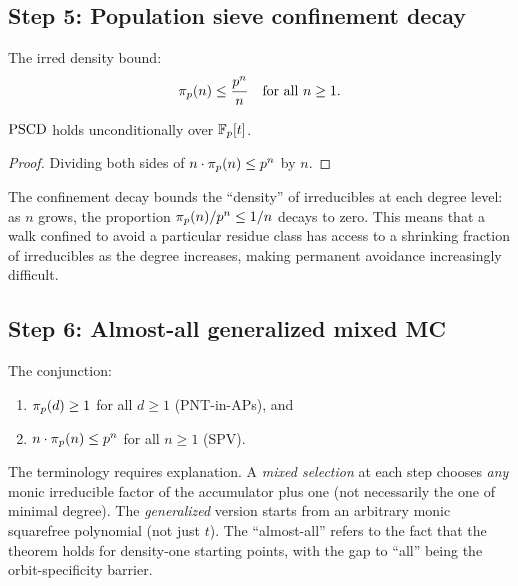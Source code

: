
\subsection{Step 5: Population sieve confinement decay}

\begin{definition}
The irred density bound:
\[
  \pi_p(n) \leq \frac{p^n}{n} \quad \text{for all } n \geq 1.
\]
\end{definition}

\begin{theorem}\label{thm:pscd}
$\mathrm{PSCD}$ holds unconditionally over $\mathbb{F}_p[t]$.
\end{theorem}

\begin{proof}
Dividing both sides of $n \cdot \pi_p(n) \leq p^n$ by $n$.
\end{proof}

The confinement decay bounds the ``density'' of irreducibles at each degree
level: as $n$ grows, the proportion $\pi_p(n) / p^n \leq 1/n$ decays
to zero. This means that a walk confined to avoid a particular residue class
has access to a shrinking fraction of irreducibles as the degree increases,
making permanent avoidance increasingly difficult.


\subsection{Step 6: Almost-all generalized mixed MC}

\begin{definition}\label{def:almost-all}
The conjunction:
\begin{enumerate}[label=(\roman*)]
  \item $\pi_p(d) \geq 1$ for all $d \geq 1$ (PNT-in-APs), and
  \item $n \cdot \pi_p(n) \leq p^n$ for all $n \geq 1$ (SPV).
\end{enumerate}
\end{definition}

The terminology requires explanation. A \emph{mixed selection} at each step
chooses \emph{any} monic irreducible factor of the accumulator plus one (not
necessarily the one of minimal degree). The \emph{generalized} version
starts from an arbitrary monic squarefree polynomial (not just $t$). The
``almost-all'' refers to the fact that the theorem holds for density-one
starting points, with the gap to ``all'' being the orbit-specificity barrier.

